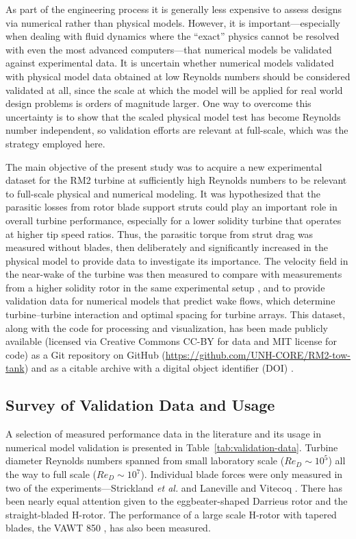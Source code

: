 \documentclass[10pt,letterpaper]{article}
\begin{document}
As part of the engineering process it is generally less expensive to assess
designs via numerical rather than physical models. However, it is
important---especially when dealing with fluid dynamics where the ``exact''
physics cannot be resolved with even the most advanced computers---that
numerical models be validated against experimental data. It is uncertain whether
numerical models validated with physical model data obtained at low Reynolds
numbers should be considered validated at all, since the scale at which the
model will be applied for real world design problems is orders of magnitude
larger. One way to overcome this uncertainty is to show that the scaled physical
model test has become Reynolds number independent, so validation efforts are
relevant at full-scale, which was the strategy employed here.

The main objective of the present study was to acquire a new experimental
dataset for the RM2 turbine at sufficiently high Reynolds numbers to be relevant
to full-scale physical and numerical modeling. It was hypothesized that the
parasitic losses from rotor blade support struts could play an important role in
overall turbine performance, especially for a lower solidity turbine that
operates at higher tip speed ratios. Thus, the parasitic torque from strut drag
was measured without blades, then deliberately and significantly increased in
the physical model to provide data to investigate its importance. The velocity
field in the near-wake of the turbine was then measured to compare with
measurements from a higher solidity rotor in the same experimental setup
\cite{Bachant2015-JoT}, and to provide validation data for numerical models that
predict wake flows, which determine turbine--turbine interaction and optimal
spacing for turbine arrays. This dataset, along with the code for processing and
visualization, has been made publicly available (licensed via Creative Commons
CC-BY for data and MIT license for code) as a Git repository on GitHub
(\url{https://github.com/UNH-CORE/RM2-tow-tank}) and as a citable archive with a
digital object identifier (DOI) \cite{Bachant2016-RM2-data}.


\subsection*{Survey of Validation Data and Usage}

A selection of measured performance data in the literature and its usage in
numerical model validation is presented in Table~\ref{tab:validation-data}.
Turbine diameter Reynolds numbers spanned from small laboratory scale ($Re_D
\sim 10^5$) all the way to full scale ($Re_D \sim 10^7$). Individual blade
forces were only measured in two of the experiments---Strickland \emph{et al.}
\cite{Strickland1981} and Laneville and Vitecoq \cite{Laneville1986}. There has
been nearly equal attention given to the eggbeater-shaped Darrieus rotor and the
straight-bladed H-rotor. The performance of a large scale H-rotor with tapered
blades, the VAWT 850 \cite{Mays1990}, has also been measured.
\end{document}
